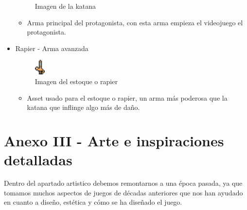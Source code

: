 \documentclass[a4paper]{article}
\begin{document}
\begin{appendices}
\begin{itemize}
\begin{figure}[!ht]
            \caption{Imagen de la katana}
            \label{fig:katana}
        \end{figure}
        \begin{itemize}
            \item Arma principal del protagonista, con esta arma empieza el videojuego el protagonista.
        \end{itemize}
        \item Rapier - Arma avanzada
        \begin{figure}[!ht]
            \centering
            \includegraphics[width=0.05\textwidth]{Images/rapier.png}
            \caption{Imagen del estoque o rapier}
            \label{fig:rapier}
        \end{figure}
        \begin{itemize}
            \item Asset usado para el estoque o rapier, un arma más poderosa que la katana que inflinge algo más de daño.
        \end{itemize}
    \end{itemize}
    \clearpage

    \section{Anexo III - Arte e inspiraciones detalladas}
    Dentro del apartado artistico debemos remontarnos a una época pasada, ya que tomamos muchos aspectos de juegos de décadas anteriores que nos han ayudado en cuanto a diseño, estética y cómo se ha
    diseñado el juego.


\end{appendices}
\end{document}
